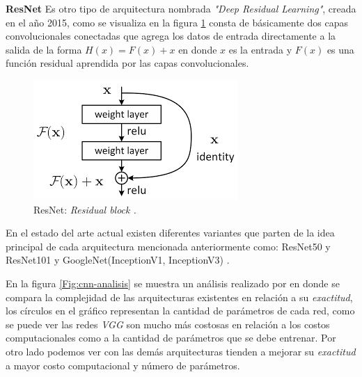 \par \textbf{ResNet} \citep{resnet_a} Es otro tipo de arquitectura nombrada \textit{"Deep Residual Learning"}, creada en el año 2015, como se visualiza en la figura \ref{Fig:resnet} consta de básicamente dos capas convolucionales conectadas que agrega los datos de entrada directamente a la salida de la forma $H(x) = F(x) + x$ en donde $x$ es la entrada y $F(x)$ es una función residual aprendida por las capas convolucionales.

\begin{figure}[H]
 \centering
  \includegraphics[scale=0.6,keepaspectratio=true,clip=true]{imagenes/MarcoTeorico/resnet.png}
  \caption{ResNet: \textit{Residual block \citep{resnet_a}.}}
	\label{Fig:resnet}
\end{figure}


En el estado del arte actual existen diferentes variantes que parten de la idea principal de cada arquitectura mencionada anteriormente como: ResNet50 y ResNet101 \citep{resnet_a} y GoogleNet(InceptionV1, InceptionV3) \citep{googlenet} . 

En la  figura \ref{Fig:cnn-analisis} se muestra un análisis realizado por \cite{Analysis_deep_network} en donde se compara la complejidad de las arquitecturas existentes en relación a su \textit{exactitud}, los círculos en el gráfico representan la cantidad de parámetros de cada red, como se puede ver las redes \textit{VGG} son mucho más costosas en relación a los costos computacionales como a la cantidad de parámetros que se debe entrenar. Por otro lado podemos ver con las demás arquitecturas tienden a mejorar su \textit{exactitud} a mayor costo computacional y número de parámetros.


